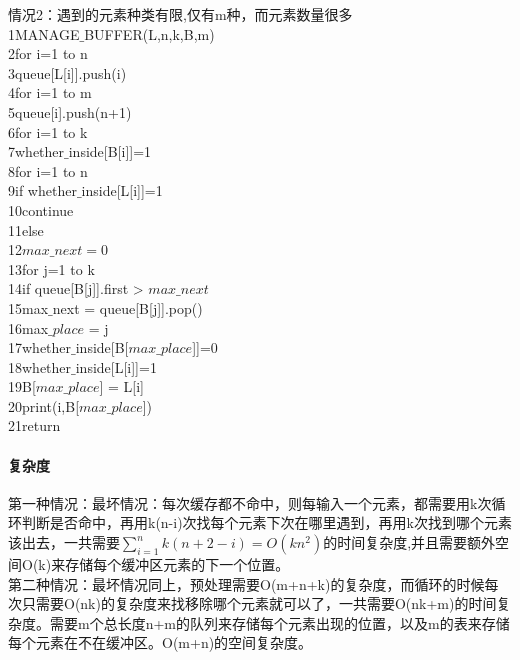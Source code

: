 \documentclass{article}
\begin{document}
\begin{CJK}{UTF8}{gkai}
情况2：遇到的元素种类有限,仅有m种，而元素数量很多\\
1\qquad MANAGE$\_$BUFFER(L,n,k,B,m)\\
2\qquad for i=1 to n\\
3\qquad\qquad queue[L[i]].push(i)\\
4\qquad for i=1 to m\\
5\qquad\qquad queue[i].push(n+1)\\
6\qquad for i=1 to k\\
7\qquad\qquad whether$\_$inside[B[i]]=1\\
8\qquad for i=1 to n\\
9\qquad\qquad if whether$\_$inside[L[i]]=1\\
10\qquad\qquad\qquad continue\\
11\qquad\qquad else\\
12\qquad\qquad\qquad $max\_next = 0$\\
13\qquad\qquad\qquad for j=1 to k\\
14\qquad\qquad\qquad\qquad if queue[B[j]].first > $max\_next$\\
15\qquad\qquad\qquad\qquad\qquad max$\_$next = queue[B[j]].pop()\\
16\qquad\qquad\qquad\qquad\qquad max$\_place$ = j\\
17\qquad\qquad\qquad whether$\_$inside[B[$max\_place$]]=0\\
18\qquad\qquad\qquad whether$\_$inside[L[i]]=1\\
19\qquad\qquad\qquad B[$max\_place$] = L[i]\\
20\qquad\qquad\qquad print(i,B[$max\_place$])\\
21\qquad return \\

\paragraph{复杂度}
第一种情况：最坏情况：每次缓存都不命中，则每输入一个元素，都需要用k次循环判断是否命中，再用k(n-i)次找每个元素下次在哪里遇到，再用k次找到哪个元素该出去，一共需要$\sum_{i=1}^{n}k(n+2-i) = O(kn^{2})$的时间复杂度,并且需要额外空间O(k)来存储每个缓冲区元素的下一个位置。\\
第二种情况：最坏情况同上，预处理需要O(m+n+k)的复杂度，而循环的时候每次只需要O(nk)的复杂度来找移除哪个元素就可以了，一共需要O(nk+m)的时间复杂度。需要m个总长度n+m的队列来存储每个元素出现的位置，以及m的表来存储每个元素在不在缓冲区。O(m+n)的空间复杂度。\\

\end{CJK}
\end{document}
